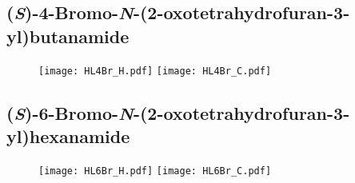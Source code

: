 %
%
%
%

\subsection{(\textit{S})-4-Bromo-\textit{N}-(2-oxotetrahydrofuran-3-yl)butanamide }

\begin{figure}[H]
	\centering
		\texttt{[image: HL4Br\_H.pdf]}
		\texttt{[image: HL4Br\_C.pdf]}
\end{figure}

\subsection{(\textit{S})-6-Bromo-\textit{N}-(2-oxotetrahydrofuran-3-yl)hexanamide }

\begin{figure}[H]
	\centering
		\texttt{[image: HL6Br\_H.pdf]}
		\texttt{[image: HL6Br\_C.pdf]}
\end{figure}

